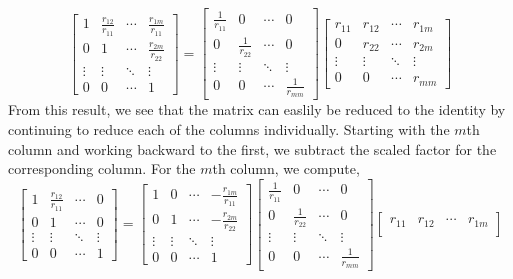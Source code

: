\documentclass[letterpaper,10pt]{article}
\begin{document}
\begin{enumerate}
\[\begin{bmatrix}
1 & \frac{r_{12}}{r_{11}} & \cdots & \frac{r_{1m}}{r_{11}}\\
0 & 1 & \cdots & \frac{r_{2m}}{r_{22}}\\
\vdots & \vdots & \ddots & \vdots\\
0 & 0 & \cdots & 1
\end{bmatrix}=\begin{bmatrix}
\frac{1}{r_{11}} & 0 & \cdots & 0\\
0 & \frac{1}{r_{22}} & \cdots & 0\\
\vdots & \vdots & \ddots & \vdots\\
0 & 0 & \cdots & \frac{1}{r_{mm}}
\end{bmatrix}\begin{bmatrix}
r_{11} & r_{12} & \cdots & r_{1m}\\
0 & r_{22} & \cdots & r_{2m}\\
\vdots & \vdots & \ddots & \vdots\\
0 & 0 & \cdots & r_{mm}
\end{bmatrix} \]
From this result, we see that the matrix can easlily be reduced to the identity by continuing to reduce each of the columns individually. Starting with the $m$th column and working backward to the first, we subtract the scaled factor for the corresponding column. For the $m$th column, we compute,
\[\begin{bmatrix}
1 & \frac{r_{12}}{r_{11}} & \cdots & 0\\
0 & 1 & \cdots & 0\\
\vdots & \vdots & \ddots & \vdots\\
0 & 0 & \cdots & 1
\end{bmatrix}=\begin{bmatrix}
1 & 0 & \cdots & -\frac{r_{1m}}{r_{11}}\\
0 & 1 & \cdots & -\frac{r_{2m}}{r_{22}}\\
\vdots & \vdots & \ddots & \vdots\\
0 & 0 & \cdots & 1
\end{bmatrix} \begin{bmatrix}
\frac{1}{r_{11}} & 0 & \cdots & 0\\
0 & \frac{1}{r_{22}} & \cdots & 0\\
\vdots & \vdots & \ddots & \vdots\\
0 & 0 & \cdots & \frac{1}{r_{mm}}
\end{bmatrix}\begin{bmatrix}
r_{11} & r_{12} & \cdots & r_{1m}\\

\end{bmatrix}\]
\end{enumerate}
\end{document}
